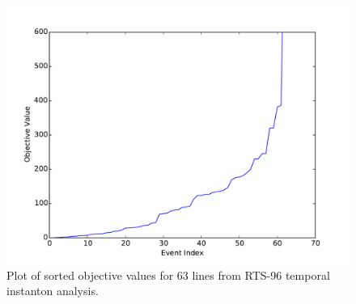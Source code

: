 \documentclass[conference]{IEEEtran}
\begin{document}
\begin{figure}
\centering
\includegraphics[width=1\linewidth]{../images/scores}
\caption{Plot of sorted objective values for 63 lines from RTS-96 temporal instanton analysis.}
\label{fig:scores}
\end{figure}





%

%


\end{document}
